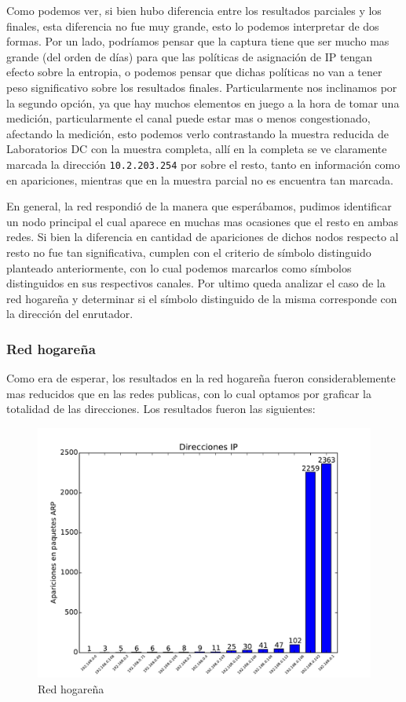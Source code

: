 Como podemos ver, si bien hubo diferencia entre los resultados parciales y los finales, esta diferencia no fue muy grande, esto lo podemos interpretar de dos formas. Por un lado, podríamos pensar que la captura tiene que ser mucho mas grande (del orden de días) para que las políticas de asignación de IP tengan efecto sobre la entropia, o podemos pensar que dichas políticas no van a tener peso significativo sobre los resultados finales. Particularmente nos inclinamos por la segundo opción, ya que hay muchos elementos en juego a la hora de tomar una medición, particularmente el canal puede estar mas o menos congestionado, afectando la medición, esto podemos verlo contrastando la muestra reducida de Laboratorios DC con la muestra completa, allí en la completa se ve claramente marcada la dirección \texttt{10.2.203.254} por sobre el resto, tanto en información como en apariciones, mientras que en la muestra parcial no es encuentra tan marcada.

En general, la red respondió de la manera que esperábamos, pudimos identificar un nodo principal el cual aparece en muchas mas ocasiones que el resto en ambas redes. Si bien la diferencia en cantidad de apariciones de dichos nodos respecto al resto no fue tan significativa, cumplen con el criterio de símbolo distinguido planteado anteriormente, con lo cual podemos marcarlos como símbolos distinguidos en sus respectivos canales. Por ultimo queda analizar el caso de la red hogareña y determinar si el símbolo distinguido de la misma corresponde con la dirección del enrutador.

\subsubsection{Red hogareña}

Como era de esperar, los resultados en la red hogareña fueron considerablemente mas reducidos que en las redes publicas, con lo cual optamos por graficar la totalidad de las direcciones. Los resultados fueron las siguientes:

\begin{figure}[H]
\begin{center}
\includegraphics[width=0.8\columnwidth]{graficos/hogar_s2.pdf}
\caption{Red hogareña}
\end{center}
\end{figure}

